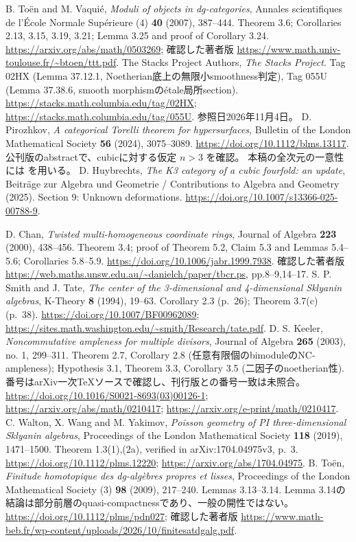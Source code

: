 B. Toën and M. Vaquié,
\emph{Moduli of objects in dg-categories},
Annales scientifiques de l'École Normale Supérieure (4) \textbf{40} (2007), 387--444.
Theorem 3.6; Corollaries 2.13, 3.15, 3.19, 3.21; Lemma 3.25 and proof of Corollary 3.24.
\url{https://arxiv.org/abs/math/0503269};
確認した著者版 \url{https://www.math.univ-toulouse.fr/~btoen/ttt.pdf}.
The Stacks Project Authors, \emph{The Stacks Project}.
Tag 02HX (Lemma 37.12.1, Noetherian底上の無限小smoothness判定),
Tag 055U (Lemma 37.38.6, smooth morphismのétale局所section).
\url{https://stacks.math.columbia.edu/tag/02HX};
\url{https://stacks.math.columbia.edu/tag/055U}.
参照日2026年11月4日。
D. Pirozhkov, \emph{A categorical Torelli theorem for hypersurfaces},
Bulletin of the London Mathematical Society \textbf{56} (2024), 3075--3089.
\url{https://doi.org/10.1112/blms.13117}.
公刊版のabstractで、cubicに対する仮定 \(n>3\) を確認。
本稿の全次元の一意性には \cite[Theorem 1.7]{LZ} を用いる。
D. Huybrechts, \emph{The K3 category of a cubic fourfold: an update},
Beiträge zur Algebra und Geometrie / Contributions to Algebra and Geometry (2025).
Section 9: Unknown deformations.
\url{https://doi.org/10.1007/s13366-025-00788-9}.

D. Chan, \emph{Twisted multi-homogeneous coordinate rings},
Journal of Algebra \textbf{223} (2000), 438--456.
Theorem 3.4; proof of Theorem 5.2, Claim 5.3 and Lemmas 5.4--5.6;
Corollaries 5.8--5.9.
\url{https://doi.org/10.1006/jabr.1999.7938}.
確認した著者版 \url{https://web.maths.unsw.edu.au/~danielch/paper/tbcr.ps}, pp.8--9,14--17.
S. P. Smith and J. Tate,
\emph{The center of the 3-dimensional and 4-dimensional Sklyanin algebras},
K-Theory \textbf{8} (1994), 19--63.
Corollary 2.3 (p.~26); Theorem 3.7(c) (p.~38).
\url{https://doi.org/10.1007/BF00962089};
\url{https://sites.math.washington.edu/~smith/Research/tate.pdf}.
D. S. Keeler, \emph{Noncommutative ampleness for multiple divisors},
Journal of Algebra \textbf{265} (2003), no. 1, 299--311.
Theorem 2.7, Corollary 2.8 (任意有限個のbimoduleのNC-ampleness);
Hypothesis 3.1, Theorem 3.3, Corollary 3.5 (二因子のnoetherian性).
番号はarXiv一次TeXソースで確認し、刊行版との番号一致は未照合。
\url{https://doi.org/10.1016/S0021-8693(03)00126-1};
\url{https://arxiv.org/abs/math/0210417};
\url{https://arxiv.org/e-print/math/0210417}.
C. Walton, X. Wang and M. Yakimov,
\emph{Poisson geometry of PI three-dimensional Sklyanin algebras},
Proceedings of the London Mathematical Society \textbf{118} (2019), 1471--1500.
Theorem 1.3(1),(2a), verified in arXiv:1704.04975v3, p.~3.
\url{https://doi.org/10.1112/plms.12220};
\url{https://arxiv.org/abs/1704.04975}.
B. Toën, \emph{Finitude homotopique des dg-algèbres propres et lisses},
Proceedings of the London Mathematical Society (3) \textbf{98} (2009), 217--240.
Lemmas 3.13--3.14. Lemma 3.14の結論は部分前層のquasi-compactnessであり、一般の開性ではない。
\url{https://doi.org/10.1112/plms/pdn027};
確認した著者版 \url{https://www.math-beb.fr/wp-content/uploads/2026/10/finitesatdgalg.pdf}.

